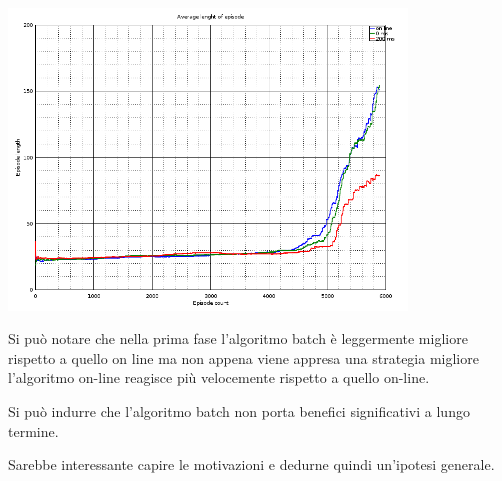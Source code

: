 \documentclass[a4paper,11pt]{article}
\begin{document}
\includegraphics[width=300pt]{episodes-123}

Si può notare che nella prima fase l'algoritmo batch è leggermente migliore rispetto a quello on line ma non appena viene appresa una strategia migliore l'algoritmo on-line reagisce più velocemente rispetto a quello on-line.

Si può indurre che l'algoritmo batch non porta benefici significativi a lungo termine.

Sarebbe interessante capire le motivazioni e dedurne quindi un'ipotesi generale.
\end{document}
